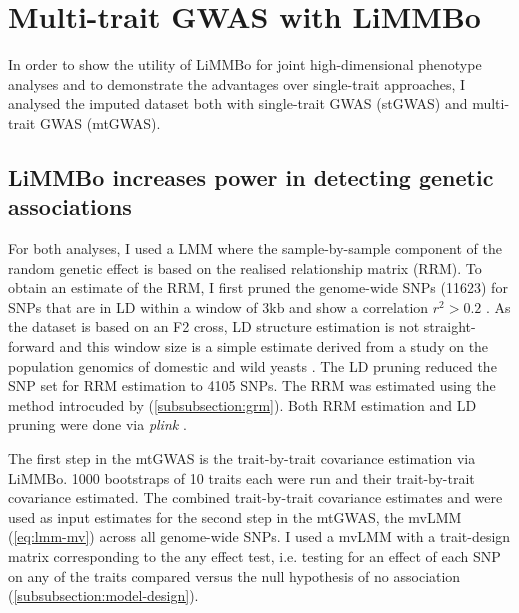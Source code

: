 \newpage
\section{Multi-trait GWAS with LiMMBo}
In order to show the utility of LiMMBo for joint high-dimensional phenotype analyses and to demonstrate the advantages over single-trait approaches, I analysed the imputed dataset both with single-trait GWAS (stGWAS) and multi-trait GWAS (mtGWAS). 

\subsection{LiMMBo increases power in detecting genetic associations}
\label{subsection:power-yeast}
For both analyses, I used a LMM where the sample-by-sample component of the random genetic effect is based on the  realised relationship matrix (RRM). To obtain an estimate of the RRM, I first pruned the genome-wide SNPs (\num{11623}) for SNPs that are in LD within a window of 3kb and show a correlation \(r^2 > 0.2\) . As the dataset is based on an F2 cross, LD structure estimation is not straight-forward and this window size is a simple estimate derived from a study on the population genomics of domestic and wild yeasts \citep{Liti2009}. The LD pruning reduced the SNP set for RRM estimation to \num{4105} SNPs. The RRM was estimated using the method introcuded by \citet{Yang2011} (\cref{subsubsection:grm}). Both RRM estimation and LD pruning were done via \textit{plink} \citep{Chang2015}.

The first step in the mtGWAS is the trait-by-trait covariance estimation via LiMMBo. \num{1000} bootstraps of \num{10} traits each were run and their trait-by-trait covariance estimated. The combined trait-by-trait covariance estimates  and  were used as input estimates for the second step in the mtGWAS, the mvLMM  (\cref{eq:lmm-mv}) across all genome-wide SNPs. I used a mvLMM with a trait-design matrix corresponding to the any effect test, i.e. testing for an effect of each SNP on any of the traits compared versus the null hypothesis of no association (\cref{subsubsection:model-design}).

